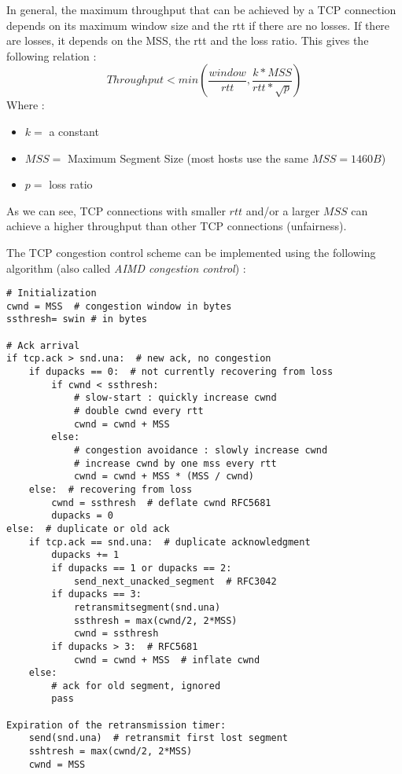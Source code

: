 In general, the maximum throughput that can be achieved by a TCP connection depends on its maximum window size and the rtt if there are no losses. If there are losses, it depends on the MSS, the rtt and the loss ratio. This gives the following relation :
\begin{equation*}
Throughput < min(\frac{window}{rtt}, \frac{k * MSS}{rtt * \sqrt{p}})
\end{equation*}
Where :
\begin{itemize}
\item $k =$ a constant
\item $MSS =$ Maximum Segment Size (most hosts use the same $MSS = 1460B$)
\item $p =$ loss ratio
\end{itemize}

As we can see, TCP connections with smaller $rtt$ and/or a larger $MSS$ can achieve a higher throughput than other TCP connections (unfairness).

\newpage
The TCP congestion control scheme can be implemented using the following algorithm (also called \textit{AIMD congestion control}) :
\begin{verbatim}
# Initialization
cwnd = MSS  # congestion window in bytes
ssthresh= swin # in bytes

# Ack arrival
if tcp.ack > snd.una:  # new ack, no congestion
    if dupacks == 0:  # not currently recovering from loss
        if cwnd < ssthresh:
            # slow-start : quickly increase cwnd
            # double cwnd every rtt
            cwnd = cwnd + MSS
        else:
            # congestion avoidance : slowly increase cwnd
            # increase cwnd by one mss every rtt
            cwnd = cwnd + MSS * (MSS / cwnd)
    else:  # recovering from loss
        cwnd = ssthresh  # deflate cwnd RFC5681
        dupacks = 0
else:  # duplicate or old ack
    if tcp.ack == snd.una:  # duplicate acknowledgment
        dupacks += 1
        if dupacks == 1 or dupacks == 2:
            send_next_unacked_segment  # RFC3042
        if dupacks == 3:
            retransmitsegment(snd.una)
            ssthresh = max(cwnd/2, 2*MSS)
            cwnd = ssthresh
        if dupacks > 3:  # RFC5681
            cwnd = cwnd + MSS  # inflate cwnd
    else:
        # ack for old segment, ignored
        pass

Expiration of the retransmission timer:
    send(snd.una)  # retransmit first lost segment
    sshtresh = max(cwnd/2, 2*MSS)
    cwnd = MSS
\end{verbatim}

